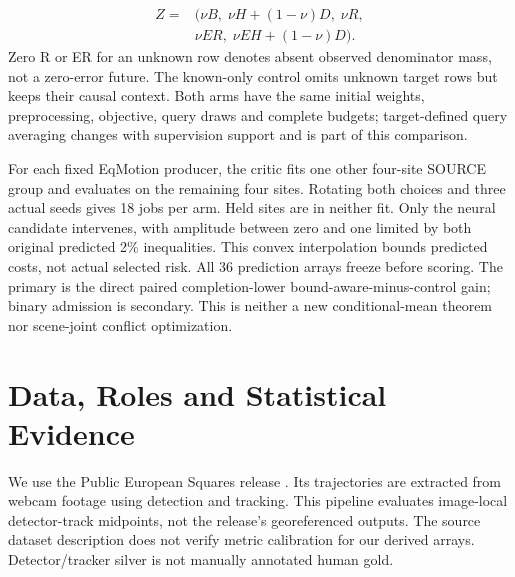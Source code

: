 \documentclass[10pt,twocolumn,letterpaper]{article}
\begin{document}
\begin{equation}
\begin{aligned}
Z={}&(\nu B,\;\nu H+(1-\nu)D,\;\nu R,\\
    &\nu ER,\;\nu EH+(1-\nu)D).
\end{aligned}
\end{equation}
Zero R or ER for an unknown row denotes absent observed denominator mass, not
a zero-error future. The known-only control omits unknown target rows but keeps
their causal context. Both arms have the same initial weights, preprocessing,
objective, query draws and complete budgets; target-defined query averaging
changes with supervision support and is part of this comparison.

For each fixed EqMotion producer, the critic fits one other four-site SOURCE
group and evaluates on the remaining four sites. Rotating both choices and
three actual seeds gives 18 jobs per arm. Held sites are in neither fit.
Only the neural candidate intervenes, with amplitude between zero and one
limited by both original predicted 2\% inequalities. This convex interpolation
bounds predicted costs, not actual selected risk. All 36 prediction arrays
freeze before scoring. The primary is the direct paired completion-lower
bound-aware-minus-control gain; binary admission is secondary. This is neither
a new conditional-mean theorem nor scene-joint conflict optimization.

\section{Data, Roles and Statistical Evidence}
We use the Public European Squares release \cite{ref6}. Its trajectories are extracted
from webcam footage using detection and tracking. This pipeline evaluates
image-local detector-track midpoints, not the release's georeferenced outputs.
The source dataset description does not verify metric calibration for our
derived arrays. Detector/tracker silver is not manually annotated human gold.
\end{document}
